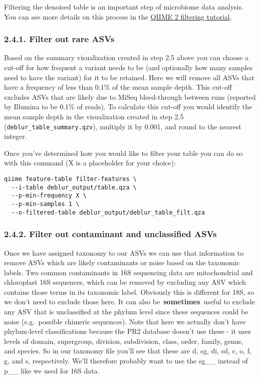 \documentclass[
]{book}
\begin{document}
Filtering the denoised table is an important step of microbiome data analysis. You can see more details on this process in the \href{https://docs.qiime2.org/2022.11/tutorials/filtering/}{QIIME 2 filtering tutorial}.

\subsubsection{2.4.1. Filter out rare ASVs}\label{filter-out-rare-asvs-1}

Based on the summary visualization created in step 2.5 above you can choose a cut-off for how frequent a variant needs to be (and optionally how many samples need to have the variant) for it to be retained. Here we will remove all ASVs that have a frequency of less than 0.1\% of the mean sample depth. This cut-off excludes ASVs that are likely due to MiSeq bleed-through between runs (reported by Illumina to be 0.1\% of reads). To calculate this cut-off you would identify the mean sample depth in the visualization created in step 2.5 (\texttt{deblur\_table\_summary.qzv}), multiply it by 0.001, and round to the nearest integer.

Once you've determined how you would like to filter your table you can do so with this command (X is a placeholder for your choice):

\begin{verbatim}
qiime feature-table filter-features \
  --i-table deblur_output/table.qza \
  --p-min-frequency X \
  --p-min-samples 1 \
  --o-filtered-table deblur_output/deblur_table_filt.qza
\end{verbatim}

\subsubsection{2.4.2. Filter out contaminant and unclassified ASVs}\label{filter-out-contaminant-and-unclassified-asvs-1}

Once we have assigned taxonomy to our ASVs we can use that information to remove ASVs which are likely contaminants or noise based on the taxonomic labels. Two common contaminants in 16S sequencing data are mitochondrial and chloroplast 16S sequences, which can be removed by excluding any ASV which contains those terms in its taxonomic label. Obviously this is different for 18S, so we don't need to exclude those here. It can also be~\textbf{sometimes}~useful to exclude any ASV that is unclassified at the phylum level since these sequences could be noise (e.g.~possible chimeric sequences). Note that here we actually don't have phylum-level classifications because the PR2 database doesn't use these - it uses levels of domain, supergroup, division, subdivision, class, order, family, genus, and species. So in our taxonomy file you'll see that these are d, sg, di, sd, c, o, f, g, and s, respectively. We'll therefore probably want to use the sg\_\_ instead of p\_\_ like we used for 16S data.
\end{document}

